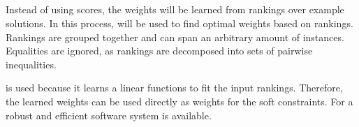 \subsection{\svm}
\label{sec:svm}
Instead of using scores, the weights will be learned from rankings over example solutions.
In this process, \svm \cite{joachims2002optimizing} will be used to find optimal weights based on rankings.
Rankings are grouped together and can span an arbitrary amount of instances.
Equalities are ignored, as rankings are decomposed into sets of pairwise inequalities.

\svm is used because it learns a linear functions to fit the input rankings.
Therefore, the learned weights can be used directly as weights for the soft constraints.
For \svm a robust and efficient software system is available.